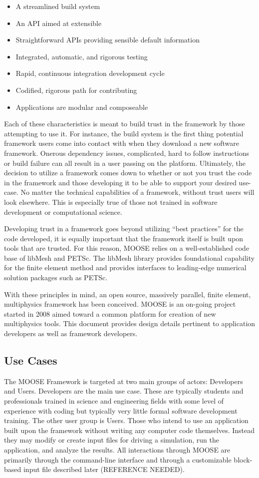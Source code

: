 \documentclass{INLreport}
\begin{document}
\begin{itemize}
  \item A streamlined build system
  \item An API aimed at extensible
  \item Straightforward APIs providing sensible default information
  \item Integrated, automatic, and rigorous testing
  \item Rapid, continuous integration development cycle
  \item Codified, rigorous path for contributing
  \item Applications are modular and composeable
\end{itemize}

Each of these characteristics is meant to build trust in the framework by those attempting to use it. For instance,
the build system is the first thing potential framework users come into contact with when they download a new
software framework. Onerous dependency issues, complicated, hard to follow instructions or build failure can all
result in a user passing on the platform. Ultimately, the decision to utilize a framework comes down to whether or
not you trust the code in the framework and those developing it to be able to support your desired use-case.
No matter the technical capabilities of a framework, without trust users will look elsewhere. This is especially
true of those not trained in software development or computational science.

Developing trust in a framework goes beyond utilizing ``best practices'' for the code developed, it is equally
important that the framework itself is built upon tools that are trusted. For this reason, MOOSE relies on a
well-established code base of libMesh and PETSc.
The libMesh library provides foundational capability for the finite element method and provides interfaces to
leading-edge numerical solution packages such as PETSc.

With these principles in mind, an open source, massively parallel, finite element, multiphysics framework has been conceived.
MOOSE is an on-going project started in 2008 aimed toward a common platform for creation of new multiphysics tools.
This document provides design details pertinent to application developers as well as framework developers.

\subsection{Use Cases}
The MOOSE Framework is targeted at two main groups of actors: Developers and Users. Developers are the main
use case. These are typically students and professionals trained in science and engineering fields with some
level of experience with coding but typically very little formal software development training. The other user
group is Users. Those who intend to use an application built upon the framework without writing any computer
code themselves. Instead they may modify or create input files for driving a simulation, run the application, and
analyze the results. All interactions through MOOSE are primarily through the command-line interface and through
a customizable block-based input file described later (REFERENCE NEEDED).
\end{document}
